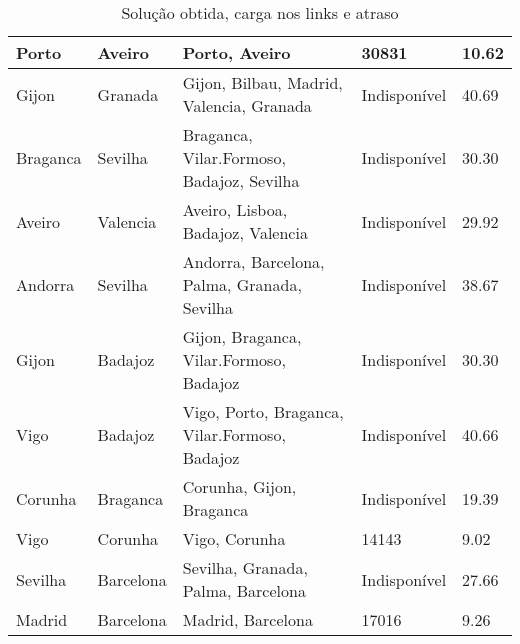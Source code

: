 \begin{table}[!htb]
{\begin{tabular}{|l|l|l|l|l|}
Porto & Aveiro & Porto, Aveiro & 30831 & 10.62 \\ \hline
Gijon & Granada & Gijon, Bilbau, Madrid, Valencia, Granada & Indisponível & 40.69 \\ \hline
Braganca & Sevilha & Braganca, Vilar.Formoso, Badajoz, Sevilha & Indisponível & 30.30 \\ \hline
Aveiro & Valencia & Aveiro, Lisboa, Badajoz, Valencia & Indisponível & 29.92 \\ \hline
Andorra & Sevilha & Andorra, Barcelona, Palma, Granada, Sevilha & Indisponível & 38.67 \\ \hline
Gijon & Badajoz & Gijon, Braganca, Vilar.Formoso, Badajoz & Indisponível & 30.30 \\ \hline
Vigo & Badajoz & Vigo, Porto, Braganca, Vilar.Formoso, Badajoz & Indisponível & 40.66 \\ \hline
Corunha & Braganca & Corunha, Gijon, Braganca & Indisponível & 19.39 \\ \hline
Vigo & Corunha & Vigo, Corunha & 14143 & 9.02 \\ \hline
Sevilha & Barcelona & Sevilha, Granada, Palma, Barcelona & Indisponível & 27.66 \\ \hline
Madrid & Barcelona & Madrid, Barcelona & 17016 & 9.26 \\ \hline
\end{tabular}}
\caption[]{Solução obtida, carga nos links e atraso}
\end{table}

